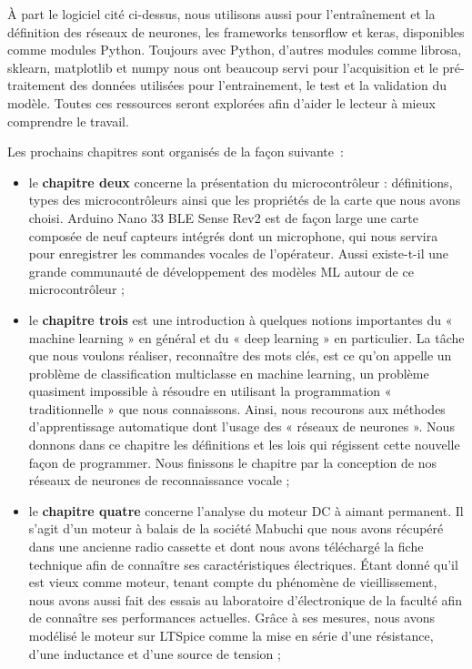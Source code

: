 \documentclass[a4paper,12pt,twoside]{report}
\theoremstyle{definition}
\theoremstyle{plain}
\theoremstyle{remark}
\begin{document}
À part le logiciel cité ci-dessus, nous utilisons aussi pour l'entraînement et la définition des réseaux de neurones, les frameworks tensorflow et keras, disponibles comme modules Python. Toujours avec Python, d'autres modules comme librosa, sklearn, matplotlib et numpy nous ont beaucoup servi pour l'acquisition et le pré-traitement des données utilisées pour l'entrainement, le test et la validation du modèle.
Toutes ces ressources seront explorées afin d'aider le lecteur à mieux comprendre le travail.

Les prochains chapitres sont organisés de la façon suivante~:
\begin{itemize}
	\item le \textbf{chapitre deux} concerne la présentation du microcontrôleur : définitions, types des microcontrôleurs ainsi que les propriétés de la carte que nous avons choisi. Arduino Nano 33 \ac{BLE} Sense Rev2 est de façon large une carte composée de neuf capteurs intégrés dont un microphone, qui nous servira pour enregistrer les commandes vocales de l'opérateur. Aussi existe-t-il une grande communauté de développement des modèles \ac{ML} autour de ce microcontrôleur ;
	
	\item le \textbf{chapitre trois} est une introduction à quelques notions importantes du « machine learning » en général et du « deep learning » en particulier. La tâche que nous voulons réaliser, reconnaître des mots clés, est ce qu'on appelle un problème de classification multiclasse en machine learning, un problème quasiment impossible à résoudre en utilisant la programmation « traditionnelle » que nous connaissons. Ainsi, nous recourons aux méthodes d'apprentissage automatique dont l'usage des « réseaux de neurones ». Nous donnons dans ce chapitre les définitions et les lois qui régissent cette nouvelle façon de programmer. Nous finissons le chapitre par la conception de nos réseaux de neurones de reconnaissance vocale ;
	
	\item le \textbf{chapitre quatre} concerne l'analyse du moteur \ac{DC} à aimant permanent. Il s'agit d'un moteur à balais de la société Mabuchi que nous avons récupéré dans une ancienne radio cassette et dont nous avons téléchargé la fiche technique afin de connaître ses caractéristiques électriques. Étant donné qu'il est vieux comme moteur, tenant compte du phénomène de vieillissement, nous avons aussi fait des essais au laboratoire d'électronique de la faculté afin de connaître ses performances actuelles. Grâce à ses mesures, nous avons modélisé le moteur sur LTSpice comme la mise en série d'une résistance, d'une inductance et d'une source de tension ;
	

\end{itemize}
\end{document}
